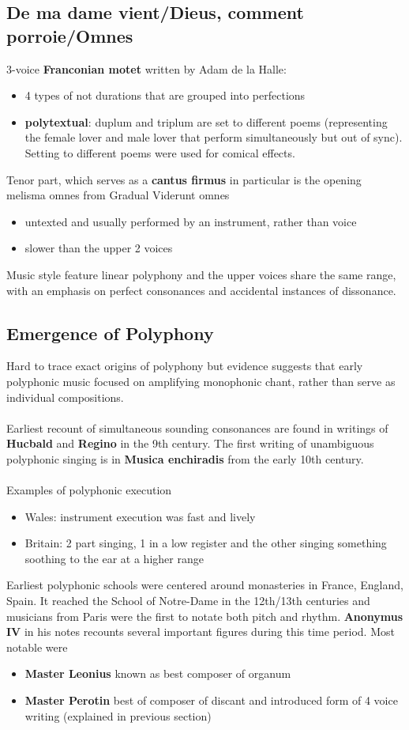 \documentclass{article}
\begin{document}
  \subsection{De ma dame vient/Dieus, comment porroie/Omnes}
  3-voice \textbf{Franconian motet} written by Adam de la Halle:
  \begin{itemize}
    \item 4 types of not durations that are grouped into perfections
    \item \textbf{polytextual}: duplum and triplum are set to different poems (representing the female lover and male lover that perform simultaneously but out of sync). Setting to different poems were used for comical effects. \\
  \end{itemize}
  Tenor part, which serves as a \textbf{cantus firmus} in particular is the opening melisma omnes from Gradual Viderunt omnes
  \begin{itemize}
    \item untexted and usually performed by an instrument, rather than voice
    \item slower than the upper 2 voices
  \end{itemize}
  Music style feature linear polyphony and the upper voices share the same range, with an emphasis on perfect consonances and accidental instances of dissonance.
  \subsection{Emergence of Polyphony}
  Hard to trace exact origins of polyphony but evidence suggests that early polyphonic music focused on amplifying monophonic chant, rather than serve as individual compositions. \\ \\
  Earliest recount of simultaneous sounding consonances are found in writings of \textbf{Hucbald} and \textbf{Regino} in the 9th century. The first writing of unambiguous polyphonic singing is in \textbf{Musica enchiradis} from the early 10th century. \\ \\
  Examples of polyphonic execution
  \begin{itemize}
    \item Wales: instrument execution was fast and lively
    \item Britain: 2 part singing, 1 in a low register and the other singing something soothing to the ear at a higher range
  \end{itemize}
  Earliest polyphonic schools were centered around monasteries in France, England, Spain. It reached the School of Notre-Dame in the 12th/13th centuries and musicians from Paris were the first to notate both pitch and rhythm. \textbf{Anonymus IV} in his notes recounts several important figures during this time period. Most notable were
  \begin{itemize}
    \item \textbf{Master Leonius} known as best composer of organum
    \item \textbf{Master Perotin} best of composer of discant and introduced form of 4 voice writing (explained in previous section)
  \end{itemize}
\end{document}
